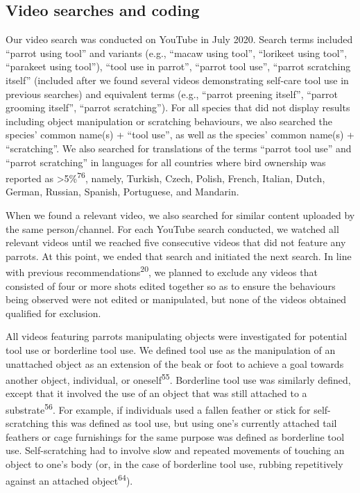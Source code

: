 \documentclass[
  man,floatsintext]{apa6}
\begin{document}
\hypertarget{video-searches-and-coding}{%
\subsection{Video searches and coding}\label{video-searches-and-coding}}

Our video search was conducted on YouTube in July 2020. Search terms included ``parrot using tool'' and variants (e.g., ``macaw using tool'', ``lorikeet using tool'', ``parakeet using tool''), ``tool use in parrot'', ``parrot tool use'', ``parrot scratching itself'' (included after we found several videos demonstrating self-care tool use in previous searches) and equivalent terms (e.g., ``parrot preening itself'', ``parrot grooming itself'', ``parrot scratching''). For all species that did not display results including object manipulation or scratching behaviours, we also searched the species' common name(s) + ``tool use'', as well as the species' common name(s) + ``scratching''. We also searched for translations of the terms ``parrot tool use'' and ``parrot scratching'' in languages for all countries where bird ownership was reported as \textgreater5\%\textsuperscript{76}, namely, Turkish, Czech, Polish, French, Italian, Dutch, German, Russian, Spanish, Portuguese, and Mandarin.

When we found a relevant video, we also searched for similar content uploaded by the same person/channel. For each YouTube search conducted, we watched all relevant videos until we reached five consecutive videos that did not feature any parrots. At this point, we ended that search and initiated the next search. In line with previous recommendations\textsuperscript{20}, we planned to exclude any videos that consisted of four or more shots edited together so as to ensure the behaviours being observed were not edited or manipulated, but none of the videos obtained qualified for exclusion.

All videos featuring parrots manipulating objects were investigated for potential tool use or borderline tool use. We defined tool use as the manipulation of an unattached object as an extension of the beak or foot to achieve a goal towards another object, individual, or oneself\textsuperscript{55}. Borderline tool use was similarly defined, except that it involved the use of an object that was still attached to a substrate\textsuperscript{56}. For example, if individuals used a fallen feather or stick for self-scratching this was defined as tool use, but using one's currently attached tail feathers or cage furnishings for the same purpose was defined as borderline tool use. Self-scratching had to involve slow and repeated movements of touching an object to one's body (or, in the case of borderline tool use, rubbing repetitively against an attached object\textsuperscript{64}).
\end{document}
